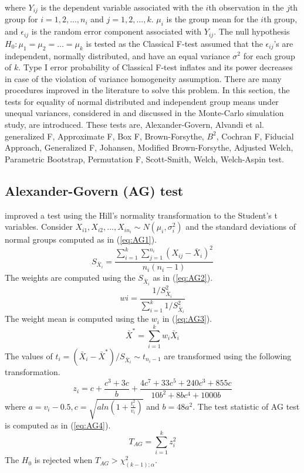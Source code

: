 \noindent where $Y_{ij}$ is the dependent variable associated with the $i$th observation in the $j$th group for $i= 1, 2, ..., n_i$ and $j= 1, 2, ..., k$. $\mu_i$ is the group mean for the $i$th group, and $\epsilon_{ij}$ is the random error component associated with $Y_{ij}$. The null hypothesis $H_0: \mu_1=\mu_2= ...= \mu_k$ is tested as the Classical F-test assumed that the $\epsilon_{ij}$'s are independent, normally distributed, and have an equal variance $\sigma^2$ for each group of $k$. Type I error probability of Classical F-test inflates and its power decreases in case of the violation of variance homogeneity assumption. There are many procedures improved in the literature to solve this problem. In this section, the tests for equality of normal distributed and independent group means under unequal variances, considered in  and discussed in the Monte-Carlo simulation study, are introduced. These tests are, Alexander-Govern, Alvandi et al. generalized F, Approximate F, Box F, Brown-Forsythe, $B^2$, Cochran F, Fiducial Approach, Generalized F, Johansen, Modified Brown-Forsythe, Adjusted Welch, Parametric Bootstrap, Permutation F, Scott-Smith, Welch, Welch-Aspin test.

\subsection{Alexander-Govern (AG) test}

\cite{alexander:1994} improved a test using the Hill’s normality transformation to the Student’s t variables. Consider $X_{i1}, X_{i2}, ..., X_{in_i} \sim N(\mu_i, \sigma_i^2)$ and the standard deviations of normal groups computed as in (\ref{eq:AG1}).
\begin{equation}
S_{\bar{X}_i}= \frac{\sum_{i=1}^k \sum_{j=1}^{n_i} (X_{ij}-\bar{X}_i)^2}{n_i(n_i-1)} \label{eq:AG1}
\end{equation} 
The weights are computed using the $S_{\bar{X}_i}$ as in (\ref{eq:AG2}).
\begin{equation}
wi=\frac{1/S_{\bar{X}_i}^2}{\sum_{i=1}^k 1/S_{\bar{X}_i}^2} \label{eq:AG2}
\end{equation}
The weight mean is computed using the $w_i$ in (\ref{eq:AG3}).
\begin{equation}
\bar{X}^*=\sum_{i=1}^k w_i\bar{X}_i \label{eq:AG3}
\end{equation}
The values of $t_i=(\bar{X}_i-\bar{X}^*)/S_{\bar{X}_i} \sim t_{n_i-1}$ are transformed using the following transformation.
\begin{equation}
z_i=c+\frac{c^3+3c}{b}+\frac{4c^7+33c^5+240c^3+855c}{10b^2+8bc^4+1000b}
\end{equation}
where $a=v_i-0.5, c=\sqrt{a ln (1+\frac{t_i^2}{v_i})}$ and $b=48a^2$. The test statistic of AG test is computed as in (\ref{eq:AG4}).
\begin{equation}
T_{AG}=\sum_{i=1}^k z_i^2 \label{eq:AG4}
\end{equation}
The $H_0$ is rejected when $T_{AG}>\chi^2_{(k-1); \alpha}$.
